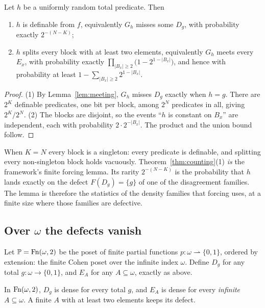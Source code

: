 \begin{theorem}\label{thm:counting}
Let $h$ be a uniformly random total predicate. Then
\begin{enumerate}\itemsep0pt
\item $h$ is definable from $f$, equivalently $G_h$ misses some $D_g$, with probability exactly
$2^{-(N-K)}$;
\item $h$ splits every block with at least two elements, equivalently $G_h$ meets every $E_x$, with
probability exactly $\prod_{|B_x|\ge2}\bigl(1-2^{1-|B_x|}\bigr)$, and hence with probability at
least $1-\sum_{|B_x|\ge2}2^{1-|B_x|}$.
\end{enumerate}
\end{theorem}

\begin{proof}
(1) By Lemma~\ref{lem:meeting}, $G_h$ misses $D_g$ exactly when $h=g$. There are $2^K$ definable
predicates, one bit per block, among $2^N$ predicates in all, giving $2^K/2^N$. (2) The blocks are
disjoint, so the events ``$h$ is constant on $B_x$'' are independent, each with probability
$2\cdot2^{-|B_x|}$. The product and the union bound follow.
\end{proof}

When $K=N$ every block is a singleton: every predicate is definable, and splitting every
non-singleton block holds vacuously. Theorem~\ref{thm:counting}(1) \emph{is} the framework's
finite forcing lemma. Its rarity $2^{-(N-K)}$ is the probability that $h$ lands exactly on the
defect $F(D_g)=\{g\}$ of one of the disagreement families. The lemma is therefore the statistics of
the density families that forcing uses, at a finite size where those families are defective.

\subsection{Over \texorpdfstring{$\omega$}{omega} the defects vanish}\label{ssec:vanish}

Let $\mathbb{P}=\operatorname{Fn}(\omega,2)$ be the poset of finite partial functions $p\colon\omega
\rightharpoonup\{0,1\}$, ordered by extension: the finite Cohen poset over the infinite index
$\omega$. Define $D_g$ for any total $g\colon\omega\to\{0,1\}$, and $E_A$ for any $A\subseteq\omega$,
exactly as above.

\begin{corollary}\label{cor:infinitecontrast}
In $\operatorname{Fn}(\omega,2)$, $D_g$ is dense for every total $g$, and $E_A$ is dense for every
\emph{infinite} $A\subseteq\omega$. A finite $A$ with at least two elements keeps its defect.
\end{corollary}

